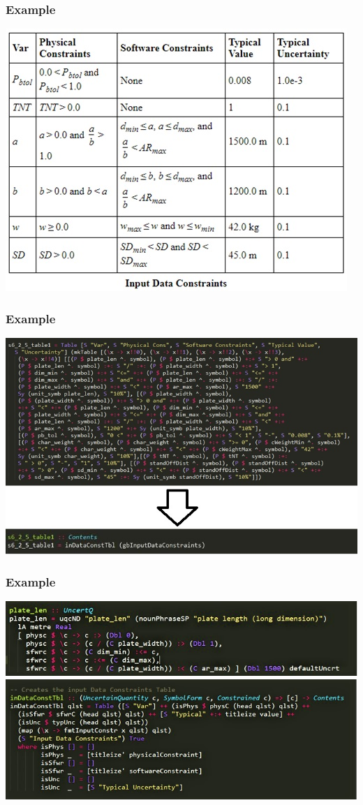 \documentclass{beamer}
\begin{document}
\begin{frame}
\frametitle{Example}
\centering
\includegraphics[scale=0.7]{InDataConsEx.jpg}
\end{frame}

\begin{frame}
\frametitle{Example}
\centering
\includegraphics[scale=0.6]{CodeComparisons.jpg}
\end{frame}

\begin{frame}
\frametitle{Example}
\centering
\includegraphics[height=0.25\textheight]{ChunkEx.jpg}
\newline
\newline
\newline
\includegraphics[height=0.40\textheight]{inDataConstTbl.jpg}
\end{frame}
\end{document}
